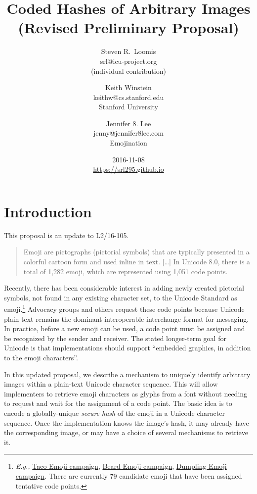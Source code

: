 \documentclass[12pt]{article}
\title{Coded Hashes of Arbitrary Images\\\normalsize \sf (Revised Preliminary Proposal)}
\author{
Steven R.~Loomis\\
\small srl@icu-project.org\\
\small (individual contribution)\\
\and
Keith Winstein\\
\small keithw@cs.stanford.edu\\
\small Stanford University\\
\and
Jennifer 8. Lee\\
\small jenny@jennifer8lee.com\\
\small Emojination\\
}
\date{2016-11-08\\\small\url{https://srl295.github.io}}
\begin{document}
\maketitle

\section{Introduction}

This proposal is an update to L2/16-105\autocite{L216105}.

\begin{quote}
Emoji are pictographs (pictorial symbols) that are typically presented
in a colorful cartoon form and used inline in text. [\ldots] In
Unicode 8.0, there is a total of 1,282 emoji, which are represented
using 1,051 code points.\autocite{UTR51}
\end{quote}

Recently, there has been considerable interest in adding newly created
pictorial symbols, not found in any existing character set, to the
Unicode Standard as emoji.\footnote{\textit{E.g.,}
  \href{https://www.change.org/p/unicode-consortium-the-taco-emoji-needs-to-happen-aeb4ebc7-a323-441d-90b9-20b90c83a8c6}{Taco
    Emoji campaign}, \href{http://www.beardemoji.com/}{Beard Emoji
    campaign}, \href{http://www.dumplingemoji.org}{Dumpling Emoji
    campaign}. There are currently 79 candidate emoji that have been
  assigned tentative code points.} Advocacy groups and others request
these code points because Unicode plain text remains the dominant
interoperable interchange format for messaging. In practice, before a
new emoji can be used, a code point must be assigned and be recognized
by the sender and receiver. The stated longer-term goal for Unicode is
that implementations should support ``embedded graphics, in addition
to the emoji characters''\autocite[Section 8, ``Longer Term
  Solutions'']{UTR51}.
  
In this updated proposal, we describe a mechanism to uniquely identify
arbitrary images within a plain-text Unicode character sequence. This
will allow implementers to retrieve emoji characters as glyphs from 
a font without needing to
request and wait for the assignment of a code point. The basic idea is
to encode a globally-unique \emph{secure hash} of the emoji in a
Unicode character sequence. Once the implementation knows the image's hash,
it may already have the corresponding image, or may have a choice of
several mechanisms to retrieve it.
\end{document}
